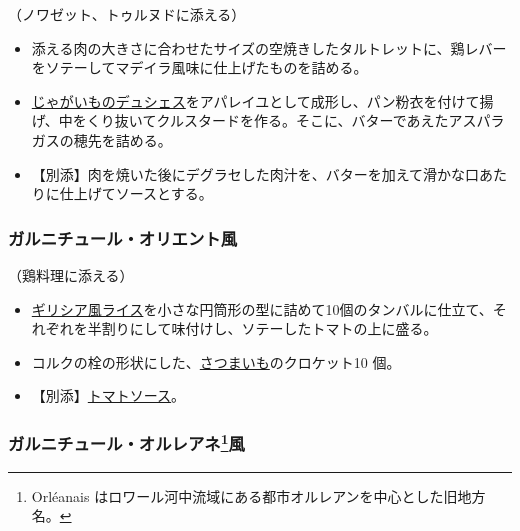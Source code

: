 \begin{recette}


（ノワゼット、トゥルヌドに添える）

\begin{itemize}
\item
  添える肉の大きさに合わせたサイズの空焼きしたタルトレットに、鶏レバーをソテーしてマデイラ風味に仕上げたものを詰める。
\item
  \protect\hyperlink{pommes-de-teres-duchesse}{じゃがいものデュシェス}をアパレイユとして成形し、パン粉衣を付けて揚げ、中をくり抜いてクルスタードを作る。そこに、バターであえたアスパラガスの穂先を詰める。
\item
  【別添】肉を焼いた後にデグラセした肉汁を、バターを加えて滑かな口あたりに仕上げてソースとする。
\end{itemize}

\atoaki{}

\hypertarget{garniture-orientale}{%
\subsubsection{ガルニチュール・オリエント風}\label{garniture-orientale}}



（鶏料理に添える）

\begin{itemize}
\item
  \protect\hyperlink{riz-grecque}{ギリシア風ライス}を小さな円筒形の型に詰めて10個のタンバルに仕立て、それぞれを半割りにして味付けし、ソテーしたトマトの上に盛る。
\item
  コルクの栓の形状にした、\protect\hyperlink{patates-douces}{さつまいも}のクロケット10
  個。
\item
  【別添】\protect\hyperlink{sauce-tomate}{トマトソース}。
\end{itemize}

\atoaki{}

\hypertarget{garniture-orelanaise}{%
\subsubsection[ガルニチュール・オルレアネ風]{\texorpdfstring{ガルニチュール・オルレアネ\footnote{Orléanais
  はロワール河中流域にある都市オルレアンを中心とした旧地方名。}風}{ガルニチュール・オルレアネ風}}\label{garniture-orelanaise}}


\end{recette}
